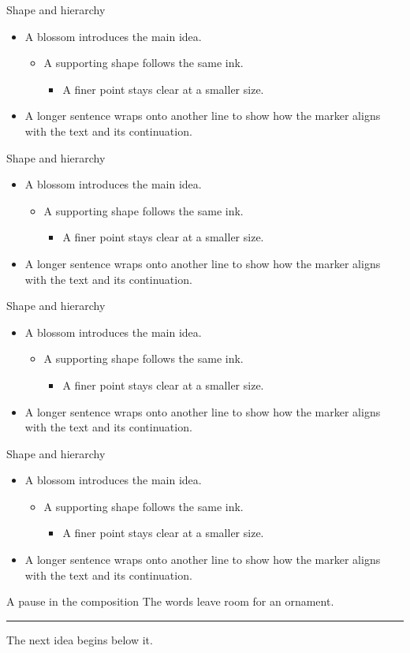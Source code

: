 \documentclass[aspectratio=\VisualAspect]{beamer}
\newcommand\ListScene{%
\begin{frame}{Shape and hierarchy}
\begin{itemize}
\item A blossom introduces the main idea.
\begin{itemize}
\item A supporting shape follows the same ink.
\begin{itemize}\item A finer point stays clear at a smaller size.\end{itemize}
\end{itemize}
\item<2-> A longer sentence wraps onto another line to show how the marker aligns with the text and its continuation.
\end{itemize}
\end{frame}}
\begin{document}
\ListScene
{}\ListScene
{}\ListScene
{}\ListScene
\begin{frame}{A pause in the composition}
The words leave room for an ornament.
\ifdefined\FloralMarkers\floraldivider\else\par\medskip\hrule\medskip\fi
The next idea begins below it.
\end{frame}
\end{document}

